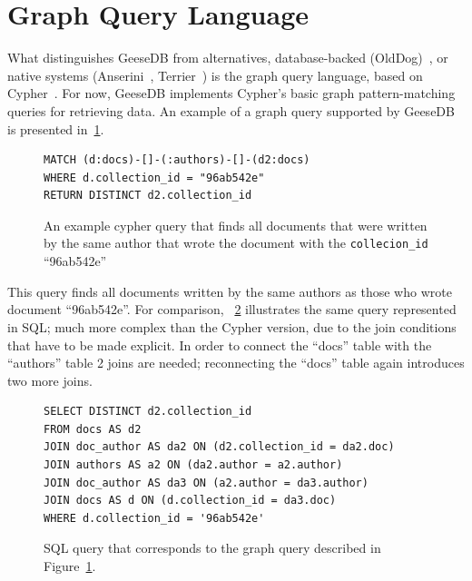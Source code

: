\section{Graph Query Language}
What distinguishes GeeseDB from alternatives, database-backed (OldDog)~\citep{olddog-docker}, or native systems (Anserini~\citep{anserini}, Terrier~\citep{terrier}) is the graph query language, based on Cypher~\citep{cypher}. 
For now, GeeseDB implements Cypher's basic graph pattern-matching queries for retrieving data. An example of a graph query supported by GeeseDB is presented in~\cref{fig:graph_query}.
\begin{figure}
	\begin{verbatim}
MATCH (d:docs)-[]-(:authors)-[]-(d2:docs)
WHERE d.collection_id = "96ab542e"
RETURN DISTINCT d2.collection_id
	\end{verbatim}
	\caption{An example cypher query that finds all documents that were written by the same author that wrote the document with the \texttt{collecion\_id} ``96ab542e''}
	\label{fig:graph_query}
\end{figure}
This query finds all documents written by the same authors as those who wrote document ``96ab542e''. For comparison, ~\cref{fig:corresponding_sql} illustrates the same query represented in SQL; much more complex than the Cypher version, due to the join conditions that have to be made explicit. In order to connect the ``docs'' table with the ``authors'' table 2 joins are needed; reconnecting the ``docs'' table again introduces two more joins.

\begin{figure}
	\begin{verbatim}
SELECT DISTINCT d2.collection_id
FROM docs AS d2
JOIN doc_author AS da2 ON (d2.collection_id = da2.doc)
JOIN authors AS a2 ON (da2.author = a2.author)
JOIN doc_author AS da3 ON (a2.author = da3.author)
JOIN docs AS d ON (d.collection_id = da3.doc)
WHERE d.collection_id = '96ab542e'
	\end{verbatim}
	\caption{SQL query that corresponds to the graph query described in Figure~\ref{fig:graph_query}.}
	\label{fig:corresponding_sql}
\end{figure}

